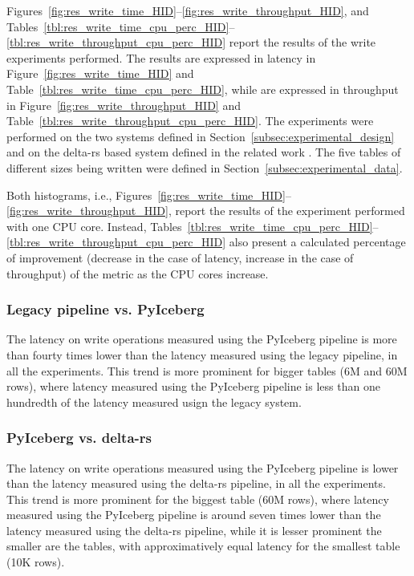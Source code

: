 Figures~\ref{fig:res_write_time_HID}--\ref{fig:res_write_throughput_HID}, and Tables~\ref{tbl:res_write_time_cpu_perc_HID}--\ref{tbl:res_write_throughput_cpu_perc_HID} report the results of the write experiments performed. The results are expressed in latency in Figure~\ref{fig:res_write_time_HID} and Table~\ref{tbl:res_write_time_cpu_perc_HID}, while are expressed in throughput in Figure~\ref{fig:res_write_throughput_HID} and Table~\ref{tbl:res_write_throughput_cpu_perc_HID}. The experiments were performed on the two systems defined in Section~\ref{subsec:experimental_design} and on the delta-rs based system defined in the related work \cite{manfrediReducingReadWrite2024}. The five tables of different sizes being written were defined in Section~\ref{subsec:experimental_data}.

Both histograms, i.e., Figures~\ref{fig:res_write_time_HID}--\ref{fig:res_write_throughput_HID}, report the results of the experiment performed with one \gls{CPU} core. Instead, Tables~\ref{tbl:res_write_time_cpu_perc_HID}--\ref{tbl:res_write_throughput_cpu_perc_HID} also present a calculated percentage of improvement (decrease in the case of latency, increase in the case of throughput) of the metric as the \gls{CPU} cores increase.

\subsubsection*{Legacy pipeline vs. PyIceberg}
The latency on write operations measured using the PyIceberg pipeline is more than fourty times lower than the latency measured using the legacy pipeline, in all the experiments. This trend is more prominent for bigger tables (6M and 60M rows), where latency measured using the PyIceberg pipeline is less than one hundredth of the latency measured usign the legacy system.

\subsubsection*{PyIceberg vs. delta-rs}
The latency on write operations measured using the PyIceberg pipeline is lower than the latency measured using the delta-rs pipeline, in all the experiments. This trend is more prominent for the biggest table (60M rows), where latency measured using the PyIceberg pipeline is around seven times lower than the latency measured using the delta-rs pipeline, while it is lesser prominent the smaller are the tables, with approximatively equal latency for the smallest table (10K rows).

